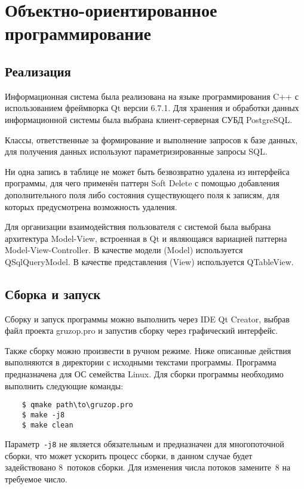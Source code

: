 \chapter{Объектно-ориентированное программирование}


\section{Реализация}
Информационная система была реализована на 
языке программирования C++ с использованием 
фреймворка Qt версии 6.7.1. 
Для хранения и обработки данных информационной системы 
была выбрана клиент-серверная СУБД PostgreSQL. 

Классы, ответственные за формирование и выполнение запросов к базе данных, 
для получения данных используют параметризированные запросы SQL.

Ни одна запись в таблице не может быть безвозвратно удалена 
из интерфейса программы, для чего применён паттерн Soft Delete
с помощью добавления дополнительного поля 
либо состояния существующего поля к записям,
для которых предусмотрена возможность удаления.

Для организации взаимодействия пользователя с системой была выбрана
архитектура Model-View, встроенная в Qt и являющаяся вариацией
паттерна Model-View-Controller. 
В качестве модели (Model) используется QSqlQueryModel. 
В качестве представления (View) используется QTableView.


\section{Сборка и запуск}
Сборку и запуск программы можно выполнить через IDE Qt Creator, 
выбрав файл проекта gruzop.pro и запустив сборку через 
графический интерфейс. 

Также сборку можно произвести в ручном режиме. Ниже описанные действия 
выполняются в директории с исходными текстами программы.
Программа предназначена для ОС семейства Linux.
Для сборки программы необходимо выполнить следующие команды:

\lstset{
    language=bash, basicstyle=\ttfamily,
    aboveskip=0mm, belowskip=5mm, xleftmargin=5mm
}

\begin{lstlisting}
    $ qmake path\to\gruzop.pro
    $ make -j8
    $ make clean
\end{lstlisting}

Параметр~\texttt{-j8} не является обязательным и предназначен для 
многопоточной сборки, что может ускорить процесс сборки, 
в данном случае будет задействовано 8~потоков сборки. Для изменения числа
потоков замените~8 на требуемое число.

